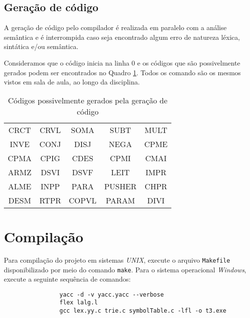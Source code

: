 \documentclass{article}
\begin{document}

	\subsection{Geração de código} %
	\label{sub:geracao_de_codigo}
		A geração de código pelo compilador é realizada em paralelo com a análise semântica e é interrompida caso seja encontrado algum erro de natureza léxica, sintática e/ou semântica.

		Consideramos que o código inicia na linha 0 e os códigos que são possivelmente gerados podem ser encontrados no Quadro \ref{tab:codigos}. Todos os comando são os mesmos vistos em sala de aula, ao longo da disciplina.

		\begin{table}[h]
			\centering	
			\ttfamily
			\begin{tabular}{c c c c c}
				\hline
				CRCT & CRVL & SOMA & SUBT & MULT \\
				INVE & CONJ & DISJ & NEGA & CPME \\
				CPMA & CPIG & CDES & CPMI & CMAI \\
				ARMZ & DSVI & DSVF & LEIT & IMPR \\
				ALME & INPP & PARA & PUSHER & CHPR \\
				DESM & RTPR & COPVL & PARAM & DIVI \\
				\hline
			\end{tabular}
			\caption{Códigos possivelmente gerados pela geração de código}
			\label{tab:codigos}
		\end{table}
	


\section{Compilação} %
\label{sec:compilacao}
	Para compilação do projeto em sistemas \emph{UNIX}, execute o arquivo \verb=Makefile= disponibilizado por meio do comando \verb=make=. Para o sistema operacional \emph{Windows}, execute a seguinte sequência de comandos:

	\begin{center}
		\begin{minipage}[ht]{0.5\textwidth}
			\begin{verbatim}
				yacc -d -v yacc.yacc --verbose 
				flex lalg.l
				gcc lex.yy.c trie.c symbolTable.c -lfl -o t3.exe
			\end{verbatim}
		\end{minipage}
	\end{center}
\end{document}
